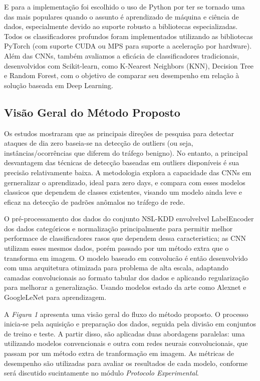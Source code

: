 \documentclass[conference]{IEEEtran}
\begin{document}
    E para a implementação foi escolhido o uso de Python por ter se tornado uma das mais populares quando o assunto é aprendizado de máquina e ciência de dados, especialmente devido ao suporte robusto a bibliotecas especializadas\cite{b14}. Todos os classificadores profundos foram implementados  utilizando as bibliotecas PyTorch (com suporte CUDA ou MPS para suporte a aceleração por hardware). Além das CNNs, também avaliamos a eficácia de classificadores tradicionais, desenvolvidos com Scikit-learn, como K-Nearest Neighbors (KNN), Decision Tree e Random Forest, com o objetivo de comparar seu desempenho em relação à solução baseada em Deep Learning.

\subsection{Visão Geral do Método Proposto}
    
    Os estudos mostraram que as principais direções de pesquisa para detectar ataques de dia zero baseia-se na detecção de outliers
    (ou seja, instâncias/ocorrências que diferem do tráfego benigno). No entanto, a principal desvantagem das
    técnicas de detecção baseadas em outliers disponíveis é sua precisão relativamente baixa\cite{b5}. A metodologia explora a capacidade das CNNs em gerneralizar o aprendizado\cite{b6}, ideal para zero days, e compara com esses modelos classicos que dependem de classes existentes\cite{b7}, visando um modelo ainda leve e eficaz na detecção de padrões anômalos no tráfego de rede.
    
    O pré-processamento dos dados do conjunto NSL-KDD envolvelvel LabelEncoder dos dados categóricos e normalização principalmente para permitir melhor performace de classificadores rasos que dependem dessa caracteristica; as CNN utilizam esses mesmos dados, porém passado por um método extra que o transforma em imagem. O modelo baseado em convolucão é então desenvolvido com uma arquitetura otimizada para problema de alta escala, adaptando camadas convolucionais ao formato tabular dos dados e aplicando regularização para melhorar a generalização. Usando modelos estado da arte como Alexnet e GoogleLeNet para aprendizagem.

    A \textit{Figura 1} apresenta uma visão geral do fluxo do método proposto. O processo inicia-se pela aquisição e preparação dos dados, seguida pela divisão em conjuntos de treino e teste. A partir disso, são aplicadas duas abordagens paralelas: uma utilizando modelos convencionais e outra com redes neurais convolucionais, que passam por um método extra de tranformação em imagem. As métricas de desempenho são utilizadas para avaliar os resultados de cada modelo, conforme será discutido sucintamente no módulo \textit{Protocolo Experimental}.
\end{document}
